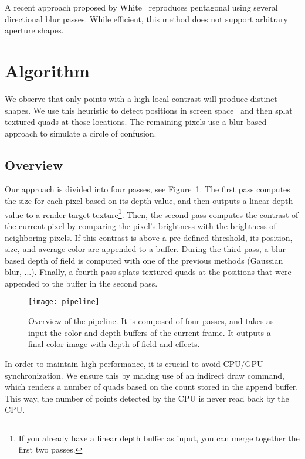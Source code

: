 A recent approach proposed by White~\cite{White11} reproduces pentagonal \bokeh using several directional blur passes. While efficient, this method does not support arbitrary aperture shapes.

\section{Algorithm}
We observe that only points with a high local contrast will produce distinct \bokeh shapes. We use this heuristic to detect \bokeh positions in screen space~\cite{Pettineo11} and then splat textured quads at those locations. The remaining pixels use a blur-based approach to simulate a circle of confusion.

\subsection{Overview}
Our approach is divided into four passes, see Figure~\ref{DeRousiers:pipeline}. The first pass computes the \coc size for each pixel based on its depth value, and then outputs a linear depth value to a render target texture\footnote{If you already have a linear depth buffer as input, you can merge together the first two passes.}. Then, the second pass computes the contrast of the current pixel by comparing the pixel's brightness with the brightness of neighboring pixels. If this contrast is above a pre-defined threshold, its position, \coc size, and average color are appended to a buffer. During the third pass, a blur-based depth of field is computed with one of the previous methods (Gaussian blur, ...). Finally, a fourth pass splats textured quads at the \bokeh positions that were appended to the buffer in the second pass.

	\begin{figure}[htb]\centering
	\texttt{[image: pipeline]}
	\caption{Overview of the pipeline. It is composed of four passes, and takes as input the color and depth buffers of the current frame. It outputs a final color image with depth of field and \bokeh effects.}
	\label{DeRousiers:pipeline}
	\end{figure}

In order to maintain high performance, it is crucial to avoid CPU/GPU synchronization. We ensure this by making use of an indirect draw command, which renders a number of quads based on the count stored in the append buffer. This way, the number of \bokeh points detected by the CPU is never read back by the CPU.

